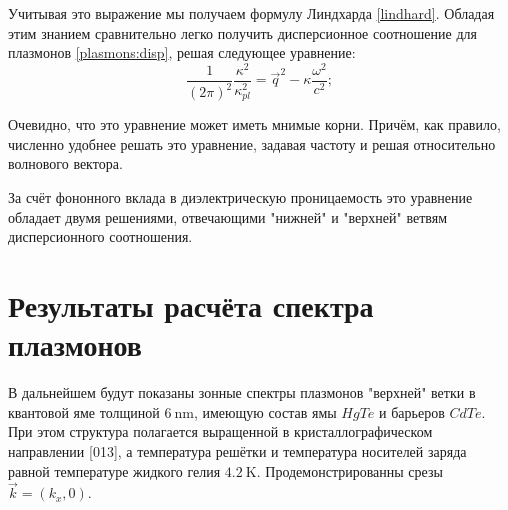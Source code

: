\documentclass[../main.tex]{subfiles}
\begin{document}
    Учитывая это выражение мы получаем формулу Линдхарда \ref{lindhard}. Обладая 
    этим знанием сравнительно легко получить дисперсионное соотношение для плазмонов
    \ref{plasmons:disp}, решая следующее уравнение:
    \begin{equation}
        \label{plasmons:disp}
        \frac{1}{(2\pi)^2}\frac{\kappa^2}{\kappa^2_{pl}} = 
        \vec{q}^2 - \kappa \frac{\omega^2}{c^2};
    \end{equation}
    
    Очевидно, что это уравнение может иметь мнимые корни. Причём, как правило,
    численно удобнее решать это уравнение, задавая частоту и решая относительно 
    волнового вектора.

    За счёт фононного вклада \cite{palik1998handbook} в диэлектрическую проницаемость 
    это уравнение обладает двумя решениями, отвечающими "нижней" и "верхней" ветвям 
    дисперсионного соотношения.

    \section{Результаты расчёта спектра плазмонов}

    В дальнейшем будут показаны зонные спектры плазмонов "верхней" ветки в 
    квантовой яме толщиной $6~\text{nm}$, имеющую состав ямы $HgTe$ и 
    барьеров $CdTe$. При этом структура полагается выращенной в кристаллографическом
    направлении [013], а температура решётки и температура носителей заряда равной 
    температуре жидкого гелия $4.2~\text{K}$. Продемонстрированны срезы 
    $\vec k = (k_x, 0)$.
\end{document}
